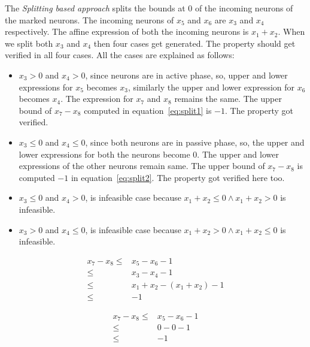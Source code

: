 The {\em Splitting based approach} splits the bounds at $0$ of the incoming neurons of the marked neurons. 
The incoming neurons of $x_5$ and $x_6$ are $x_3$ and $x_4$ respectively. 
The affine expression of both the incoming neurons is $x_1+x_2$. 
When we split both $x_3$ and $x_4$ then four cases get generated. The property should get verified in all four cases. 
All the cases are explained as follows: 
\begin{itemize}
    \item $x_3 > 0$ and $x_4 > 0$, since neurons are in active phase, so, upper and lower expressions for $x_5$ 
    becomes $x_3$, similarly the upper and lower expression for $x_6$ becomes $x_4$. 
    The expression for $x_7$ and $x_8$ remains the same. The upper bound of $x_7 - x_8$ computed in equation~\ref{eq:split1} is $-1$. 
    The property got verified.   
    \item $x_3 \leq 0$ and $x_4 \leq 0$, since both neurons are in passive phase, so, the upper and lower expressions 
        for both the neurons become $0$. The upper and lower expressions of the other neurons remain same. 
        The upper bound of $x_7 - x_8$ is computed $-1$ in equation~\ref{eq:split2}. The property got verified here too. 
    \item $x_3 \leq 0$ and $x_4 > 0$, is infeasible case because $x_1+x_2 \leq 0 \land x_1 + x_2 > 0$ is infeasible. 
    \item $x_3 > 0$ and $x_4 \leq 0$, is infeasible case because $x_1+x_2 > 0 \land x_1 + x_2 \leq 0$ is infeasible. 
\end{itemize}

\begin{equation}
    \begin{aligned}
        x_7 - x_8 \leq & x_5 - x_6 - 1 \\
       \leq & x_3 - x_4 -1 \\
       \leq & x_1 + x_2 -(x_1+x_2) -1 \\
       \leq & -1 
    \end{aligned}
    \label{eq:split1}
\end{equation}

\begin{equation}
    \begin{aligned}
      x_7 - x_8 \leq & x_5 - x_6 - 1 \\
        \leq & 0 - 0 - 1 \\
        \leq & -1
    \end{aligned}
    \label{eq:split2}
\end{equation}